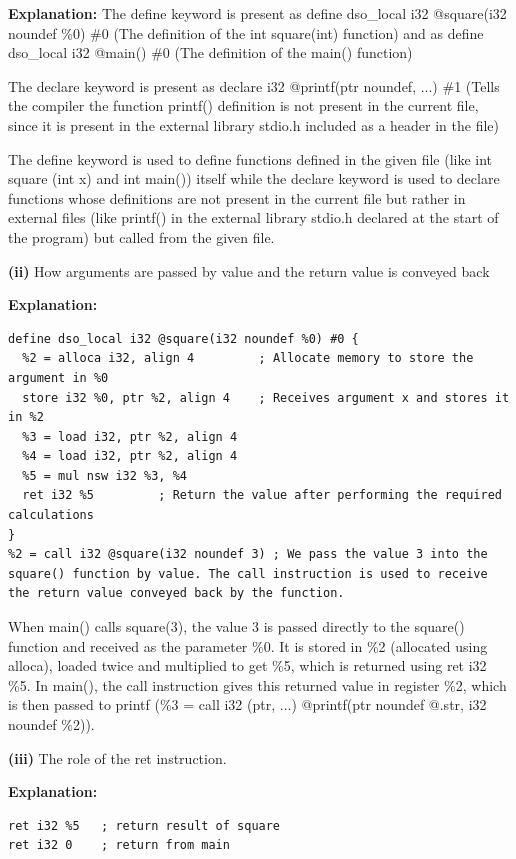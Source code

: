 \textbf{Explanation:} The define keyword is present as define dso\_local i32 @square(i32 noundef \%0) \#0 (The definition of the int square(int) function) and as define dso\_local i32 @main() \#0  (The definition of the main() function)


The declare keyword is present as declare i32 @printf(ptr noundef, ...) \#1 (Tells the compiler the function printf() definition is not present in the current file, since it is present in the external library stdio.h included as a header in the file)


The define keyword is used to define functions defined in the given file (like int square (int x) and int main()) itself while the declare keyword is used to declare functions whose definitions are not present in the current file but rather in external files (like printf() in the external library stdio.h declared at the start of the program) but called from the given file. 


\textbf{(ii) }How arguments are passed by value and the return value is conveyed back


\textbf{Explanation:} 


\begin{lstlisting}
define dso_local i32 @square(i32 noundef %0) #0 {
  %2 = alloca i32, align 4         ; Allocate memory to store the argument in %0
  store i32 %0, ptr %2, align 4    ; Receives argument x and stores it in %2
  %3 = load i32, ptr %2, align 4
  %4 = load i32, ptr %2, align 4
  %5 = mul nsw i32 %3, %4
  ret i32 %5         ; Return the value after performing the required calculations
}
%2 = call i32 @square(i32 noundef 3) ; We pass the value 3 into the square() function by value. The call instruction is used to receive the return value conveyed back by the function.
\end{lstlisting}

When main() calls square(3), the value 3 is passed directly to the square() function and received as the parameter \%0. It is stored in \%2 (allocated using alloca), loaded twice and multiplied to get \%5, which is returned using ret i32 \%5. In main(), the call instruction gives this returned value in register \%2, which is then passed to printf (\%3 = call i32 (ptr, ...) @printf(ptr noundef @.str, i32 noundef \%2)).


\textbf{(iii)} The role of the ret instruction.


\textbf{Explanation:} 


\begin{lstlisting}
ret i32 %5   ; return result of square
ret i32 0    ; return from main
\end{lstlisting}

